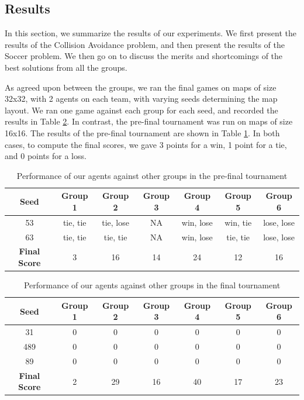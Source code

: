 \documentclass[a4paper,12pt]{article}
\begin{document}
\subsection{Results}
\label{subsec:results}
In this section, we summarize the results of our experiments. We first present the results of the Collision Avoidance problem, and then present the results of the Soccer problem. We then go on to discuss the merits and shortcomings of the best solutions from all the groups.



As agreed upon between the groups, we ran the final games on maps  of size 32x32, with 2 agents on each team, with varying seeds determining the map layout. We ran one game against each group for each seed, and recorded the results in Table \ref{tab:results_final}. In contrast, the pre-final tournament was run on maps of size 16x16. The results of the pre-final tournament are shown in Table \ref{tab:results_pre_final}. In both cases, to compute the final scores, we gave 3 points for a win, 1 point for a tie, and 0 points for a loss.


\begin{table}[!hptb]
  \centering
  \begin{tabular}{|c|c|c|c|c|c|c|}
    \hline
    \textbf{Seed} & \textbf{Group 1} & \textbf{Group 2} & \textbf{Group 3} & \textbf{Group 4} & \textbf{Group 5} & \textbf{Group 6} \\
    \hline
    53 & tie, tie & tie, lose & NA & win, lose & win, tie & lose, lose \\
    \hline
    63 & tie, tie & tie, tie & NA & win, lose & tie, tie & lose, lose \\
    \hline
    \textbf{Final Score} & 3 & 16 & 14 & 24 & 12 & 16 \\
    \hline

  \end{tabular}
  \caption{Performance of our agents against other groups in the pre-final tournament}
  \label{tab:results_pre_final}
\end{table}


\begin{table}[!hptb]
  \centering
  \begin{tabular}{|c|c|c|c|c|c|c|}
    \hline
    \textbf{Seed} & \textbf{Group 1} & \textbf{Group 2} & \textbf{Group 3} & \textbf{Group 4} & \textbf{Group 5} & \textbf{Group 6} \\
    \hline
    31 & 0 & 0 & 0 & 0 & 0 & 0 \\
    \hline
    489 & 0 & 0 & 0 & 0 & 0 & 0 \\
    \hline
    89 & 0 & 0 & 0 & 0 & 0 & 0 \\
    \hline
    \textbf{Final Score} & 2 & 29 & 16 & 40 & 17 & 23 \\
    \hline

  \end{tabular}
  \caption{Performance of our agents against other groups in the final tournament}
  \label{tab:results_final}
\end{table}
\end{document}
